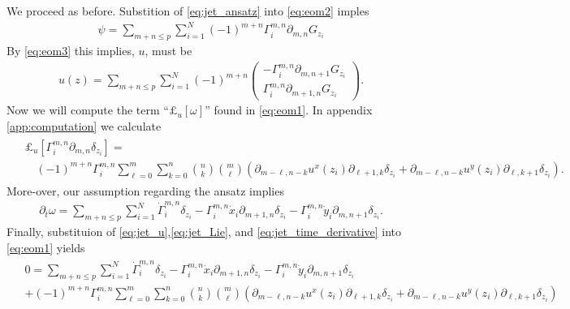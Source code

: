 \documentclass[12pt]{amsart}
\begin{document}
We proceed as before. Substition of \eqref{eq:jet_ansatz} into \eqref{eq:eom2} imples
\begin{align*}
  \psi = \sum_{m+n \leq p} \sum_{i=1}^N (-1)^{m+n}\Gamma_i^{m,n} \partial_{m,n} G_{z_i}
\end{align*}
By \eqref{eq:eom3} this implies, $u$, must be
\begin{align}
  u(z) = \sum_{m+n \leq p} \sum_{i=1}^N (-1)^{m+n}
  \begin{pmatrix}
   - \Gamma_i^{m,n} \partial_{m,n+1} G_{z_i} \\
    \Gamma_i^{m,n} \partial_{m+1,n} G_{z_i}
  \end{pmatrix}. \label{eq:jet_u}
\end{align}
Now we will compute the term ``$\pounds_u[\omega]$'' found in \eqref{eq:eom1}.
In appendix \ref{app:computation} we calculate
\begin{align}
  \begin{split}
  &\pounds_u[\Gamma_i^{m,n} \partial_{m,n} \delta_{z_i}] =\\
  &\quad (-1)^{m+n} \Gamma_i^{m,n} \sum_{\ell=0}^m \sum_{k=0}^n \binom{n}{k} \binom{m}{\ell}
   \left(\partial_{m-\ell,n-k}u^x(z_i) \partial_{\ell+1,k} \delta_{z_i}
     +\partial_{m-\ell,n-k}u^y(z_i) \partial_{\ell,k+1} \delta_{z_i}
     \right)
   .
   \end{split}\label{eq:jet_Lie}
\end{align}
More-over, our assumption regarding the ansatz implies
\begin{align}
  \partial_t \omega = \sum_{m+n \leq p} \sum_{i=1}^N \dot{\Gamma}_i^{m,n} \delta_{z_i} - \Gamma_i^{m,n} \dot{x}_i \partial_{m+1,n} \delta_{z_i} - \Gamma_i^{m,n} \dot{y}_i \partial_{m,n+1} \delta_{z_i}. \label{eq:jet_time_derivative}
\end{align}
Finally, substituion of \eqref{eq:jet_u},\eqref{eq:jet_Lie}, and \eqref{eq:jet_time_derivative} into \eqref{eq:eom1} yields
\begin{align}
  \begin{split}
    &0=\sum_{m+n \leq p} \sum_{i=1}^N \dot{\Gamma}_i^{m,n} \delta_{z_i} - \Gamma_i^{m,n} \dot{x}_i \partial_{m+1,n} \delta_{z_i} - \Gamma_i^{m,n} \dot{y}_i \partial_{m,n+1} \delta_{z_i} \\
   & +  (-1)^{m+n} \Gamma_i^{m,n} \sum_{\ell=0}^m \sum_{k=0}^n \binom{n}{k} \binom{m}{\ell}
   \left(\partial_{m-\ell,n-k}u^x(z_i) \partial_{\ell+1,k} \delta_{z_i}
     +\partial_{m-\ell,n-k}u^y(z_i) \partial_{\ell,k+1} \delta_{z_i}
     \right)
  \end{split}
  \label{eq:eom4}
\end{align}
\end{document}

